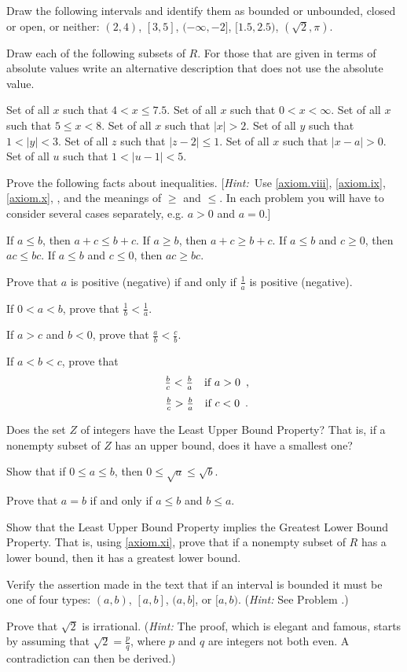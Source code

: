 \begin{exercises}
Draw the following intervals and identify them as bounded or unbounded,
closed or open, or neither:
$(2, 4)$, $[3, 5]$, $(-\infty, -2]$, $[1.5, 2.5)$, $(\sqrt2, \pi)$.

Draw each of the following subsets of $R$.
For those that are given in terms of absolute values write an alternative description
that does not use the absolute value.
\begin{exenum}
\sx
Set of all $x$ such that $4 < x \leq 7.5$.
\sx
Set of all $x$ such that $0 < x < \infty$.
\sx
Set of all $x$ such that $5 \leq x < 8$.
\sx
Set of all $x$ such that $|x| > 2$.
\sx
Set of all $y$ such that $1 < |y| < 3$.
\sx
Set of all $z$ such that $|z - 2| \leq 1$.
\sx
Set of all $x$ such that $|x - a| > 0$.
\sx
Set of all $u$ such that $1 < |u - 1| < 5$.
\end{exenum}

Prove the following facts about inequalities.
[\emph{Hint:}\ Use \ref{axiom.viii}, \ref{axiom.ix},
\ref{axiom.x}, ,
and the meanings of $\geq$ and $\leq$.
In each problem you will have to consider several cases separately,
e.g. $a > 0$ and $a = 0$.]
\begin{exenum}
\sx
If $a \leq b$, then $a + c \leq b + c$.
\sx
If $a \geq b$, then $a + c \geq b + c$.
\sx
If $a \leq b$ and $c \geq 0$, then $ac \leq bc$.
\sx
If $a \leq b$ and $ c \leq 0$, then $ac \geq bc$.
\end{exenum}

Prove that $a$ is positive (negative) if and only if $\frac1a$ is positive (negative).

If $0 < a < b$, prove that $\frac1b < \frac1a$.

If $a > c$ and $b < 0$, prove that $\frac ab < \frac cb$.

If $a < b < c$, prove that
\[
\begin{array}{ll} \frac bc < \frac ba & \mbox{if $a > 0$} \end{array}
,
\]
\[
\begin{array}{ll} \frac bc > \frac ba & \mbox{if $c < 0$} \end{array}.
\]

Does the set $Z$ of integers have the Least Upper Bound Property?
That is, if a nonempty subset of $Z$ has an upper bound,
does it have a smallest one?

Show that if $0 \leq a \leq b$, then $0 \leq \sqrt{a} \leq \sqrt{b}$.

Prove that $a = b$ if and only if $a \leq b$ and $b \leq a$.

Show that the Least Upper Bound Property implies the Greatest Lower Bound Property.
That is, using \ref{axiom.xi}, prove that if a nonempty subset of $R$ has a lower bound,
then it has a greatest lower bound.

Verify the assertion made in the text that if an interval is bounded it must be one of four types:
$(a, b)$, $[a, b]$, $(a, b]$, or $[a, b)$.  (\emph{Hint:} See Problem .)

Prove that $\sqrt2$ is irrational.
(\emph{Hint:} The proof, which is elegant and famous, starts by assuming that 
$\sqrt2 = \frac pq$, where $p$ and $q$ are integers not both even.
A contradiction can then be derived.)

\end{exercises}
